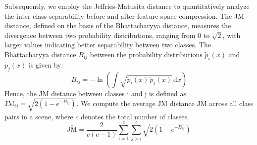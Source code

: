 Subsequently, we employ the Jeffries-Matusita distance to quantitatively analyze the inter‑class separability before and after feature‑space compression. The JM distance, defined on the basis of the Bhattacharyya distance, measures the divergence between two probability distributions, ranging from 0 to $\sqrt{2}$, with larger values indicating better separability between two classes. The Bhattacharyya distance $B_{ij}$ between the probability distributions $\tilde{p}_i(x)$ and $\tilde{p}_j(x)$ is given by:
\begin{equation}
    B_{ij} = -\ln \left( \int \sqrt{\tilde{p}_i(x) \, \tilde{p}_j(x)} \, \mathrm{d}x \right)
\end{equation}
Hence, the JM distance between classes i and j is defined as $\text{JM}_{ij} = \sqrt{2(1 - e^{-B_{ij}})}$. We compute the average JM distance $\overline{\text{JM}}$ across all class pairs in a scene, where $c$ denotes the total number of classes.
\begin{equation}
    \overline{\text{JM}} = \frac{2}{c(c-1)} \sum_{i=1}^{c} \sum_{j>i}^{c} \sqrt{2(1 - e^{-B_{ij}})}
\end{equation}

